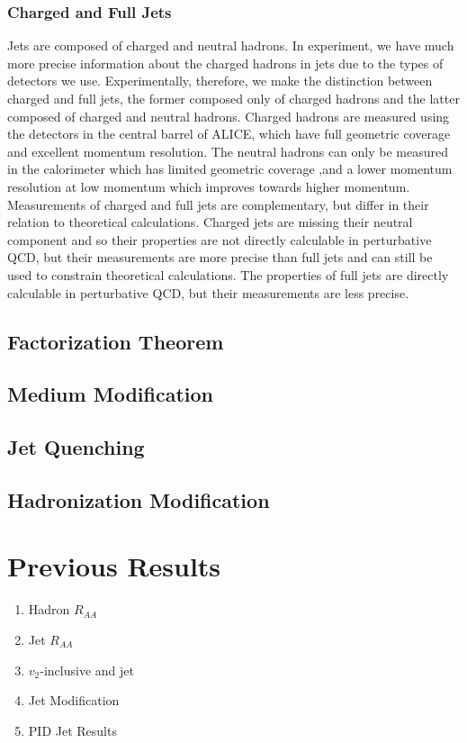 \subsubsection*{Charged and Full Jets} 
Jets are composed of charged and neutral hadrons. In experiment, we have much more precise information about the charged hadrons in jets due to the types of detectors we use. Experimentally, therefore, we make the distinction between charged and full jets, the former composed only of charged hadrons and the latter composed of charged and neutral hadrons. Charged hadrons are measured using the detectors in the central barrel of ALICE, which have full geometric coverage and excellent momentum resolution.  The neutral hadrons can only be measured in the calorimeter which has limited geometric coverage ,and a lower momentum resolution at low momentum which improves towards higher momentum. Measurements of charged and full jets are complementary, but differ in their relation to theoretical calculations. Charged jets are missing their neutral component and so their properties are not directly calculable in perturbative QCD, but their measurements are more precise than full jets and can still be used to constrain theoretical calculations. The properties of full jets are directly calculable in perturbative QCD, but their measurements are less precise. 

\subsection*{Factorization Theorem}

\subsection*{Medium Modification}

\subsection*{Jet Quenching}

\subsection*{Hadronization Modification}

\section{Previous Results}

\begin{enumerate}
    \item Hadron $R_{AA}$
    \item Jet $R_{AA}$
    \item $v_2$-inclusive and jet
    \item Jet Modification
    \item PID Jet Results
\end{enumerate}